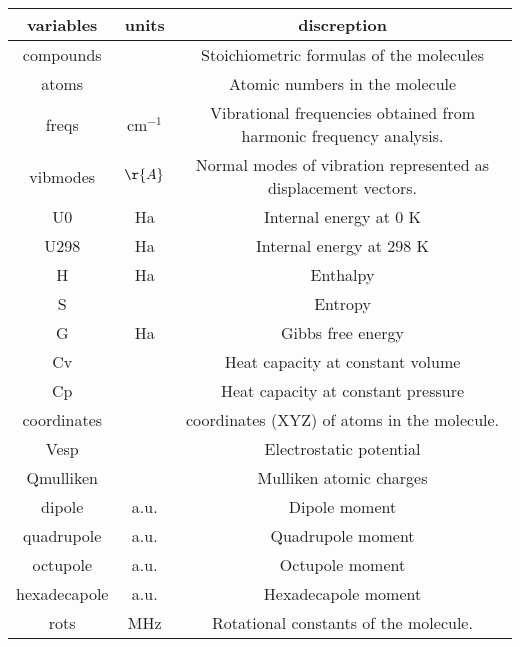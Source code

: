 \documentclass{article}
\begin{document}
\begin{center}
    \begin{tabular}{||c c c||} 
        \hline

        variables   & units    & discreption \\
        \hline\hline
        
        compounds            &         &Stoichiometric formulas of the molecules\\
        \hline
     atoms    &        &  Atomic numbers in the molecule  \\
     \hline
     freqs     &   $\text{cm}^{-1}$       &     Vibrational frequencies obtained from harmonic frequency analysis.    \\
     \hline
    vibmodes    &     $\r{A}$     &    Normal modes of vibration represented as displacement vectors.\\
    \hline U0    &      Ha       &   Internal energy at 0 K\\     
    \hline U298   &       Ha      &    Internal energy at 298 K      \\
    \hline H    &           Ha     &     Enthalpy      \\
    \hline S    &                &     Entropy      \\
    \hline G    &            Ha    &     Gibbs free energy     \\
    \hline Cv    &               &    Heat capacity at constant volume      \\
    \hline Cp    &               &    Heat capacity at constant pressure       \\
    \hline  coordinates   &               &    coordinates (XYZ) of atoms in the molecule.      \\
    \hline Vesp    &                &     Electrostatic potential     \\ 
    \hline  Qmulliken &             &     Mulliken atomic charges     \\ 
    \hline dipole   &          a.u.     &    	Dipole moment       \\
    \hline quadrupole    &    a.u.      &     Quadrupole moment     \\
    \hline octupole    &       a.u.     &    	Octupole moment      \\
    \hline hexadecapole    &     a.u.      &     Hexadecapole moment     \\
    \hline rots    &              MHz     &     Rotational constants of the molecule.     \\

\end{tabular}
\end{center}
\end{document}
